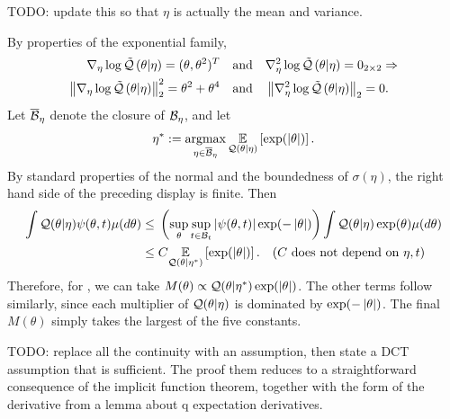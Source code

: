 

%
TODO: update this so that $\eta$ is actually the mean and variance.

By properties of the exponential family,
%
\begin{align*}
%
\lqgrad{\theta \vert \eta} ={} (\theta, \theta^2)^T \mathand&
\lqhess{\theta \vert \eta} ={} 0_{2\times2} \Rightarrow\\
%
\norm{\lqgrad{\theta \vert \eta}}_2^2 ={} \theta^2 + \theta^4 \mathand&
\norm{\lqhess{\theta \vert \eta}}_2 ={} 0.
%
\end{align*}
%
Let $\overline{\mathcal{B}}_\eta$ denote the closure of $\mathcal{B}_\eta$, and let
%
\begin{align*}
%
\eta^* := \argmax_{\eta \in \ballclosed_\eta}
    \expect{\q(\theta \vert \eta)}{\exp(\abs{\theta})}.
%
\end{align*}
%
By standard properties of the normal and the boundedness of $\sigma(\eta)$, the
right hand side of the preceding display is finite.
%
Then
%
\begin{align*}
\int \q(\theta \vert \eta) \psi(\theta, \t) \mu(d \theta) \le{}&
    \left( \sup_{\theta} \sup_{\t \in \ball_\t}
        \abs{\psi(\theta, \t)} \exp(-\abs{\theta}) \right)
    \int \q(\theta \vert \eta) \exp(\theta) \mu(d \theta)
%
\\\le{}&
    \const
    \expect{\q(\theta \vert \eta^*)}{\exp(\abs{\theta})}.
    \quad\constdesc{\eta, \t}
%
\end{align*}
%
Therefore, for , we can take $M(\theta)
\propto \mathcal{Q}(\theta \vert \eta^*) \exp(\left|\theta\right|)$. The other terms follow
similarly, since each multiplier of $\mathcal{Q}(\theta \vert \eta)$ is dominated by
$\exp(-\left|\theta\right|)$.  The final $M(\theta)$ simply takes the largest
of the five constants.
%


%
TODO: replace all the continuity with an assumption, then state a
DCT assumption that is sufficient.  The proof them reduces to a straightforward
consequence of the implicit function theorem, together with the form of the
derivative from a lemma about q expectation derivatives.

